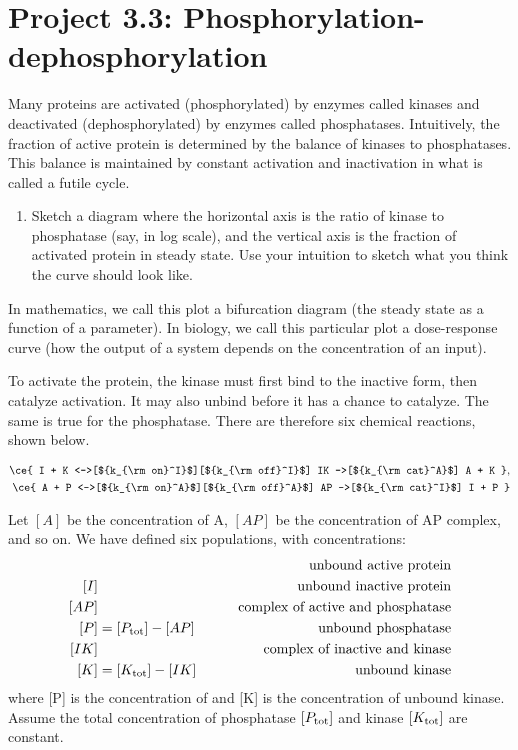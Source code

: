 \documentclass{exam}
\begin{document}
\section*{Project 3.3: Phosphorylation-dephosphorylation}
 
Many proteins are activated (phosphorylated) by enzymes called kinases and deactivated (dephosphorylated) by enzymes called phosphatases. Intuitively, the fraction of active protein is determined by the balance of kinases to phosphatases. This balance is maintained by constant activation and inactivation in what is called a futile cycle.

\begin{enumerate}
\item Sketch a diagram where the horizontal axis is the ratio of kinase to phosphatase (say, in log scale), and the vertical axis is the fraction of activated protein in steady state. Use your intuition to sketch what you think the curve should look like.
\end{enumerate}

In mathematics, we call this plot a bifurcation diagram (the steady state as a function of a parameter). In biology, we call this particular plot a dose-response curve (how the output of a system depends on the concentration of an input). 

To activate the protein, the kinase must first bind to the inactive form, then catalyze activation. It may also unbind before it has a chance to catalyze. The same is true for the phosphatase. There are therefore six chemical reactions, shown below. 

\begin{align}
\ce{ I + K <->[${k_{\rm on}^I}$][${k_{\rm off}^I}$] IK ->[${k_{\rm cat}^A}$] A + K  }, \\
\ce{ A + P <->[${k_{\rm on}^A}$][${k_{\rm off}^A}$] AP ->[${k_{\rm cat}^I}$] I + P  }
\end{align}

Let $[A]$ be the concentration of A, $[AP]$ be the concentration of AP complex, and so on. We have defined six populations, with concentrations:
\begin{align*}
[A]&&\qquad \mbox{unbound active protein}\\
[I]&&\qquad \mbox{unbound inactive protein}\\
[AP]&&\qquad \mbox{complex of active and phosphatase}\\
[P] &= [P_{\rm tot}] - [AP] &\qquad \mbox{unbound phosphatase}\\
[IK]& &\qquad \mbox{complex of inactive and kinase}\\
[K] &= [K_{\rm tot}] - [IK] &\qquad \mbox{unbound kinase}
\end{align*}
where [P] is the concentration of  and [K] is the concentration of unbound kinase. Assume the total concentration of phosphatase $[P_{\rm tot}]$ and kinase $[K_{\rm tot}]$ are constant. 
\end{document}
